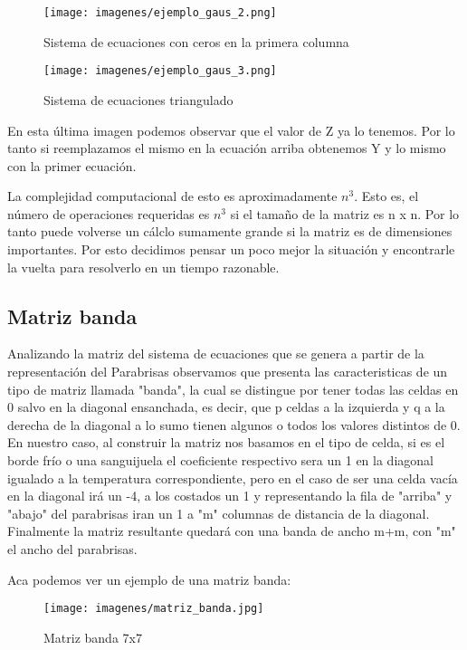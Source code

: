 \begin{figure}[htb]
\begin{center}
\texttt{[image: imagenes/ejemplo\_gaus\_2.png]} 
\caption{Sistema de ecuaciones con ceros en la primera columna} 
\end{center}
\end{figure}

\begin{figure}[htb]
\begin{center}
\texttt{[image: imagenes/ejemplo\_gaus\_3.png]} 
\caption{Sistema de ecuaciones triangulado} 
\end{center}
\end{figure}
\newpage
En esta última imagen podemos observar que el valor de Z ya lo tenemos. Por lo tanto si reemplazamos el mismo en la ecuación arriba obtenemos Y y lo mismo con la primer ecuación.

La complejidad computacional de esto es aproximadamente $n^3$. Esto es, el número de operaciones requeridas es $n^3$ si el tamaño de la matriz es n x n. Por lo tanto puede volverse un cálclo sumamente grande si la matriz es de dimensiones importantes. Por esto decidimos pensar un poco mejor la situación y encontrarle la vuelta para resolverlo en un tiempo razonable. 

\subsection{Matriz banda}

Analizando la matriz del sistema de ecuaciones que se genera a partir de la representación del Parabrisas observamos que presenta las caracteristicas de un tipo de matriz llamada "banda", la cual se distingue por tener todas las celdas en 0 salvo en la diagonal ensanchada, es decir, que p celdas a la izquierda y q a la derecha de la diagonal a lo sumo tienen algunos o todos los valores distintos de 0. En nuestro caso, al construir la matriz nos basamos en el tipo de celda, si es el borde frío o una sanguijuela el coeficiente respectivo sera un 1 en la diagonal igualado a la temperatura correspondiente, pero en el caso de ser una celda vacía en la diagonal irá un -4, a los costados un 1 y representando la fila de "arriba" y "abajo" del parabrisas iran un 1 a "m" columnas de distancia de la diagonal. Finalmente la matriz resultante quedará con una banda de ancho m+m, con "m" el ancho del parabrisas.

Aca podemos ver un ejemplo de una matriz banda:

\begin{figure}[htb]
\begin{center}
\texttt{[image: imagenes/matriz\_banda.jpg]} 
\caption{Matriz banda 7x7} 
\end{center}
\end{figure}







